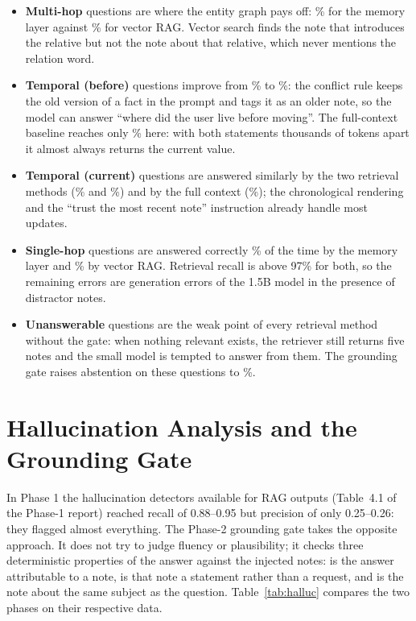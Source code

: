 \begin{itemize}[nosep]
  \item \textbf{Multi-hop} questions are where the entity graph pays off: \accMemMH\% for the memory
        layer against \accRagMH\% for vector RAG. Vector search finds the note that introduces the
        relative but not the note about that relative, which never mentions the relation word.
  \item \textbf{Temporal (before)} questions improve from \accRagTB\% to \accMemTB\%: the conflict rule
        keeps the old version of a fact in the prompt and tags it as an older note, so the model can
        answer ``where did the user live before moving''. The full-context baseline reaches only
        \accFullTB\% here: with both statements thousands of tokens apart it almost always returns the
        current value.
  \item \textbf{Temporal (current)} questions are answered similarly by the two retrieval methods
        (\accRagTC\% and \accMemTC\%) and by the full context (\accFullTC\%); the chronological rendering
        and the ``trust the most recent note'' instruction already handle most updates.
  \item \textbf{Single-hop} questions are answered correctly \accMemSH\% of the time by the memory layer
        and \accRagSH\% by vector RAG. Retrieval recall is above 97\% for both, so the remaining errors are
        generation errors of the 1.5B model in the presence of distractor notes.
  \item \textbf{Unanswerable} questions are the weak point of every retrieval method without the gate:
        when nothing relevant exists, the retriever still returns five notes and the small model is
        tempted to answer from them. The grounding gate raises abstention on these questions to
        \absMemGate\%.
\end{itemize}

\section{Hallucination Analysis and the Grounding Gate}
\label{sec:halluc}
In Phase 1 the hallucination detectors available for RAG outputs (Table~4.1 of the Phase-1 report)
reached recall of 0.88--0.95 but precision of only 0.25--0.26: they flagged almost everything. The
Phase-2 grounding gate takes the opposite approach. It does not try to judge fluency or plausibility;
it checks three deterministic properties of the answer against the injected notes: is the answer
attributable to a note, is that note a statement rather than a request, and is the note about the same
subject as the question. Table~\ref{tab:halluc} compares the two phases on their respective data.


